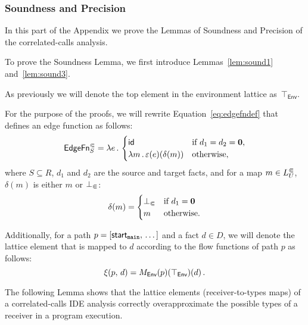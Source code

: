 \subsubsection*{Soundness and Precision}

In this part of the Appendix we prove the Lemmas of Soundness and Precision of the correlated-calls analysis.

To prove the Soundness Lemma, we first introduce Lemmas~\ref{lem:sound1} and~\ref{lem:sound3}.

As previously we will denote the top element in the environment lattice as~$\top_\textsf{Env}$.

For the purpose of the proofs, we will rewrite Equation~\eqref{eq:edgefndef} that defines an edge function as follows:
  \begin{equation}\label{eq:edgefnThroughDelta}
    \textsf{EdgeFn}^\Subset_{S}=\lambda e\,.\,
    \begin{cases}
      \textsf{id}&\text{if $d_1=d_2=\mathbf0$,}\\
      \lambda m\,.\,\varepsilon(e)(\delta(m))&\text{otherwise},
    \end{cases}
  \end{equation}
  where $S\subseteq R$, $d_1$ and $d_2$ are the source and target facts, and for a map $m\in L^\Subset_U$, $\delta(m)$ is either $m$ or $\bot_\Subset$:
  \begin{equation}\label{eq:deltadef}
    \delta(m)=\begin{cases}
      \bot_\Subset&\text{if $d_1=\mathbf0$}\\
      m&\text{otherwise.}
    \end{cases}
  \end{equation}

Additionally, for a path $p=[\textsf{start}_\texttt{main},\,\dots]$ and a fact $d\in D$, we will denote the lattice element that is mapped to $d$ according to the flow functions of path $p$ as follows:
\begin{equation}
  \xi(p,\,d)=M_\textsf{Env}(p)(\top_\textsf{Env})(d)\,.
\end{equation}

The following Lemma shows that the lattice elements (receiver-to-types maps) of a correlated-calls IDE analysis correctly overapproximate the possible types of a receiver in a program execution.

